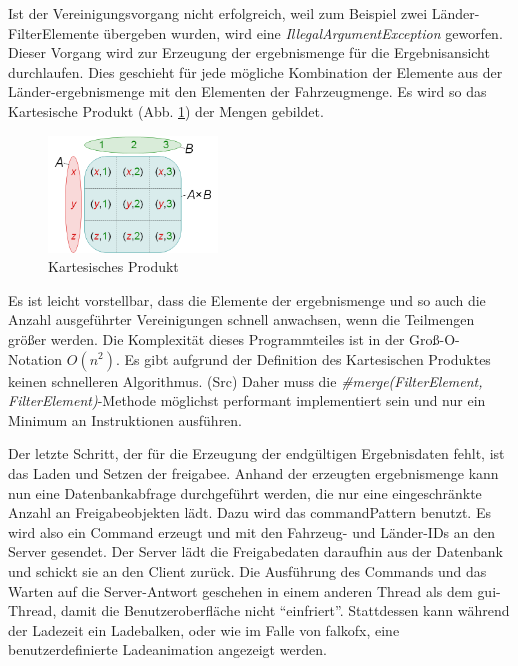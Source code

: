 Ist der Vereinigungsvorgang nicht erfolgreich, weil zum Beispiel zwei Länder-Filter\-Ele\-men\-te übergeben wurden, wird eine \textit{IllegalArgumentException} geworfen.
Dieser Vorgang wird zur Erzeugung der \gls{ergebnismenge} für die Ergebnisansicht durchlaufen. Dies geschieht für jede mögliche Kombination der Elemente aus der Länder-\gls{ergebnismenge} mit den Elementen der Fahrzeugmenge. Es wird so das Kartesische Produkt (Abb. \ref{fig:multiFilter4}) der Mengen gebildet.

\begin{figure}[H]
 \centering
 \includegraphics[width=0.4\textwidth]{grafiken/Multi_Kartesisches.png}
 \caption{Kartesisches Produkt}
 \label{fig:multiFilter4}
\end{figure}

Es ist leicht vorstellbar, dass die Elemente der \gls{ergebnismenge} und so auch die Anzahl ausgeführter Vereinigungen schnell anwachsen, wenn die Teilmengen größer werden. Die Komplexität dieses Programmteiles ist in der Groß-O-Notation $O(n^2)$. Es gibt aufgrund der Definition des Kartesischen Produktes keinen schnelleren Algorithmus. (Src) Daher muss die \textit{\#merge(FilterElement, FilterElement)}-Methode möglichst performant implementiert sein und nur ein Minimum an Instruktionen ausführen.

Der letzte Schritt, der für die Erzeugung der endgültigen Ergebnisdaten fehlt, ist das Laden und Setzen der \gls{freigabe}e. Anhand der erzeugten \gls{ergebnismenge} kann nun eine Datenbankabfrage durchgeführt werden, die nur eine eingeschränkte Anzahl an Freigabeobjekten lädt. Dazu wird das \gls{commandPattern} benutzt. Es wird also ein Command erzeugt und mit den Fahrzeug- und Länder-IDs an den Server gesendet. Der Server lädt die Freigabedaten daraufhin aus der Datenbank und schickt sie an den Client zurück. Die Ausführung des Commands und das Warten auf die Server-Antwort geschehen in einem anderen Thread als dem \gls{gui}-Thread, damit die Benutzeroberfläche nicht \enquote{einfriert}. Stattdessen kann während der Ladezeit ein Ladebalken, oder wie im Falle von \gls{falkofx}, eine benutzerdefinierte Ladeanimation angezeigt werden.

